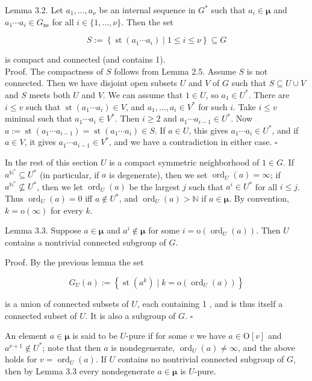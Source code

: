 \documentclass[10pt]{article}
\begin{document}
Lemma 3.2. Let $a_{1}, \ldots, a_{\nu}$ be an internal sequence in $G^{*}$ such that $a_{i} \in \boldsymbol{\mu}$ and $a_{1} \cdots a_{i} \in G_{\mathrm{ns}}$ for all $i \in\{1, \ldots, \nu\}$. Then the set

$$
S:=\left\{\operatorname{st}\left(a_{1} \cdots a_{i}\right) \mid 1 \leq i \leq \nu\right\} \subseteq G
$$

is compact and connected (and contains 1).\\
Proof. The compactness of $S$ follows from Lemma 2.5. Assume $S$ is not connected. Then we have disjoint open subsets $U$ and $V$ of $G$ such that $S \subseteq U \cup V$ and $S$ meets both $U$ and $V$. We can assume that $1 \in U$, so $a_{1} \in U^{*}$. There are $i \leq v$ such that $\operatorname{st}\left(a_{1} \cdots a_{i}\right) \in V$, and $a_{1}, \ldots, a_{i} \in V^{*}$ for such $i$. Take $i \leq v$ minimal such that $a_{1} \cdots a_{i} \in V^{*}$. Then $i \geq 2$ and $a_{1} \cdots a_{i-1} \in U^{*}$. Now $a:=\operatorname{st}\left(a_{1} \cdots a_{i-1}\right)=\operatorname{st}\left(a_{1} \cdots a_{i}\right) \in S$. If $a \in U$, this gives $a_{1} \cdots a_{i} \in U^{*}$, and if $a \in V$, it gives $a_{1} \cdots a_{i-1} \in V^{*}$, and we have a contradiction in either case. \(\square\)

In the rest of this section $U$ is a compact symmetric neighborhood of $1 \in G$. If $a^{\mathbb{N}^{*}} \subseteq U^{*}$ (in particular, if $a$ is degenerate), then we set $\operatorname{ord}_{U}(a)=\infty$; if $a^{\mathbb{N}^{*}} \nsubseteq U^{*}$, then we let $\operatorname{ord}_{U}(a)$ be the largest $j$ such that $a^{i} \in U^{*}$ for all $i \leq j$. Thus $\operatorname{ord}_{U}(a)=0$ iff $a \notin U^{*}$, and $\operatorname{ord}_{U}(a)>\mathbb{N}$ if $a \in \boldsymbol{\mu}$. By convention, $k=\mathrm{o}(\infty)$ for every $k$.

Lemma 3.3. Suppose $a \in \boldsymbol{\mu}$ and $a^{i} \notin \boldsymbol{\mu}$ for some $i=\mathrm{o}\left(\operatorname{ord}_{U}(a)\right)$. Then $U$ contains a nontrivial connected subgroup of $G$.

Proof. By the previous lemma the set

$$
G_{U}(a):=\left\{\operatorname{st}\left(a^{k}\right) \mid k=\mathrm{o}\left(\operatorname{ord}_{U}(a)\right)\right\}
$$

is a union of connected subsets of $U$, each containing 1 , and is thus itself a connected subset of $U$. It is also a subgroup of $G$. \(\square\)

An element $a \in \boldsymbol{\mu}$ is said to be $U$-pure if for some $v$ we have $a \in \mathrm{O}[v]$ and $a^{\nu+1} \notin U^{*}$; note that then $a$ is nondegenerate, $\operatorname{ord}_{U}(a) \neq \infty$, and the above holds for $v=\operatorname{ord}_{U}(a)$. If $U$ contains no nontrivial connected subgroup of $G$, then by Lemma 3.3 every nondegenerate $a \in \boldsymbol{\mu}$ is $U$-pure.
\end{document}
